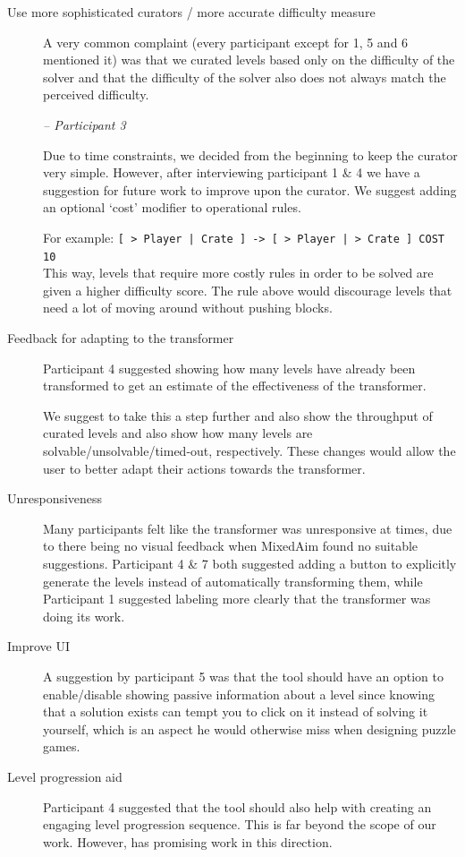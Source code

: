 \begin{description}
    \item[Use more sophisticated curators / more accurate difficulty measure]
A very common complaint (every participant except for 1, 5 and 6 mentioned it) was that we curated levels based only on the difficulty of the solver and that the difficulty of the solver also does not always match the perceived difficulty.

\textit{ -- Participant 3}

Due to time constraints, we decided from the beginning to keep the curator very simple. However, after interviewing participant 1 \& 4 we have a suggestion for future work to improve upon the curator. We suggest adding an optional `cost' modifier to operational rules. 

 For example: \lstinline{[ > Player | Crate ] -> [ > Player | > Crate ] COST 10} \hfill \\
 This way, levels that require more costly rules in order to be solved are given a higher difficulty score. The rule above would discourage levels that need a lot of moving around without pushing blocks.

 

    \item[Feedback for adapting to the transformer]
    Participant 4 suggested showing how many levels have already been transformed to get an estimate of the effectiveness of the transformer.
    
    We suggest to take this a step further and also show the throughput of curated levels and also show how many levels are solvable/unsolvable/timed-out, respectively. These changes would allow the user to better adapt their actions towards the transformer. 
    
    \item[Unresponsiveness]
    Many participants felt like the transformer was unresponsive at times, due to there being no visual feedback when MixedAim found no suitable suggestions. Participant 4 \& 7 both suggested adding a button to explicitly generate the levels instead of automatically transforming them, while Participant 1 suggested labeling more clearly that the transformer was doing its work.
    
    \item[Improve UI] A suggestion by participant 5 was that the tool should have an option to enable/disable showing passive information about a level since knowing that a solution exists can tempt you to click on it instead of solving it yourself, which is an aspect he would otherwise miss when designing puzzle games.
     
     \item[Level progression aid] Participant 4 suggested that the tool should also help with creating an engaging level progression sequence. This is far beyond the scope of our work. However, \cite{Butler2013} has promising work in this direction. 
    
\end{description}
